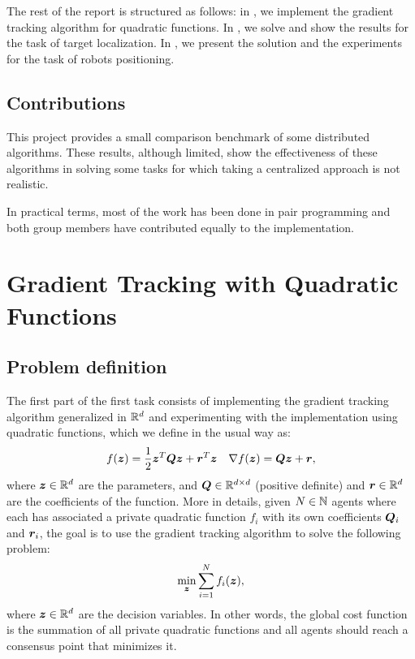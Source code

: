 \documentclass[a4paper,11pt,oneside]{book}
\begin{document}
The rest of the report is structured as follows: in , we implement the gradient tracking algorithm for quadratic functions. In , we solve and show the results for the task of target localization. In , we present the solution and the experiments for the task of robots positioning.


\section*{Contributions}

This project provides a small comparison benchmark of some distributed algorithms. These results, although limited, show the effectiveness of these algorithms in solving some tasks for which taking a centralized approach is not realistic. 

In practical terms, most of the work has been done in pair programming and both group members have contributed equally to the implementation.




\setcounter{page}{1}
\chapter{Gradient Tracking with Quadratic Functions} \label{ch:quadratic}



\section{Problem definition}

The first part of the first task consists of implementing the gradient tracking algorithm generalized in ${\mathbb{R}}^d$ and experimenting with the implementation using quadratic functions, which we define in the usual way as:
\[
      f({\bm{z}}) = \frac{1}{2} {\bm{z}}^T {\bm{Q}} {\bm{z}} + {\bm{r}}^T {\bm{z}}
      \quad
      \nabla f({\bm{z}}) = {\bm{Q}} {\bm{z}} + {\bm{r}},
\]
where ${\bm{z}} \in {\mathbb{R}}^{d}$ are the parameters, and ${\bm{Q}} \in {\mathbb{R}}^{d \times d}$ (positive definite) and ${\bm{r}} \in {\mathbb{R}}^{d}$ are the coefficients of the function. More in details, given $N \in {\mathbb{N}}$ agents where each has associated a private quadratic function $f_i$ with its own coefficients ${\bm{Q}}_i$ and ${\bm{r}}_i$, the goal is to use the gradient tracking algorithm to solve the following problem:
\[
      \min_{{\bm{z}}} \sum_{i=1}^{N} f_i({\bm{z}}),
\]
where ${\bm{z}} \in {\mathbb{R}}^{d}$ are the decision variables. In other words, the global cost function is the summation of all private quadratic functions and all agents should reach a consensus point that minimizes it.
\end{document}
